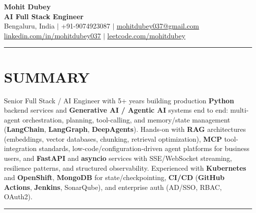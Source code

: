 \documentclass[a4paper]{article}
\newcommand{\sectionline}{
\begin{center}
\vspace{-9pt}
\rule{1\textwidth}{0.5pt}
\end{center}
\vspace{1pt}
}
\begin{document}
\begin{center}
    \textbf{\Huge Mohit Dubey} \\ \vspace{4pt}
    \textbf{AI Full Stack Engineer } \\ \vspace{6pt}
    \small Bengaluru, India $|$ +91-9074923087 $|$ \href{mailto:mohitdubey037@gmail.com}{\underline{mohitdubey037@gmail.com}} \\
    \href{https://www.linkedin.com/in/mohit-dubey-037/}{\underline{linkedin.com/in/mohitdubey037}} $|$ \href{https://leetcode.com/u/mohitdubey037/}
    {\underline{leetcode.com/mohitdubey}}
\end{center}


\sectionline
\section*{SUMMARY}
Senior Full Stack / AI Engineer with 5+ years building production \textbf{Python} backend services and \textbf{Generative AI / Agentic AI} systems end to end: multi-agent orchestration, planning, tool-calling, and memory/state management (\textbf{LangChain}, \textbf{LangGraph}, \textbf{DeepAgents}). Hands-on with \textbf{RAG} architectures (embeddings, vector databases, chunking, retrieval optimization), \textbf{MCP} tool-integration standards, low-code/configuration-driven agent platforms for business users, and \textbf{FastAPI} and \textbf{asyncio} services with SSE/WebSocket streaming, resilience patterns, and structured observability. Experienced with \textbf{Kubernetes} and \textbf{OpenShift}, \textbf{MongoDB} for state/checkpointing, \textbf{CI/CD} (\textbf{GitHub Actions}, \textbf{Jenkins}, SonarQube), and enterprise auth (AD/SSO, RBAC, OAuth2).

\sectionline
\end{document}
